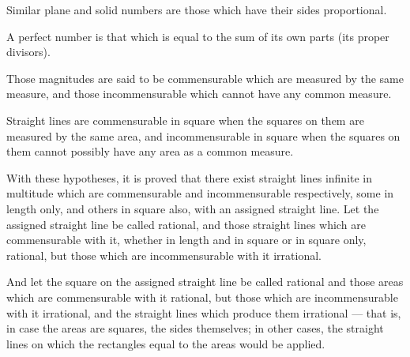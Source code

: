 \begin{scope}
\label{def:VII.21}
Similar plane and solid numbers are those which have their sides
proportional.
\end{scope}

\begin{scope}
\label{def:VII.22}
A perfect number is that which is equal to the sum of its own parts
(its proper divisors).
\end{scope}


\begin{scope}
\label{def:X.1}
Those magnitudes are said to be commensurable which are measured by
the same measure, and those incommensurable which cannot have any
common measure.
\end{scope}

\begin{scope}
\label{def:X.2}
Straight lines are commensurable in square when the squares on them
are measured by the same area, and incommensurable in square when the
squares on them cannot possibly have any area as a common measure.
\end{scope}

\begin{scope}
\label{def:X.3}
With these hypotheses, it is proved that there exist straight lines
infinite in multitude which are commensurable and incommensurable
respectively, some in length only, and others in square also, with
an assigned straight line.  Let the assigned straight line be called
rational, and those straight lines which are commensurable with it,
whether in length and in square or in square only, rational, but
those which are incommensurable with it irrational.
\end{scope}

\begin{scope}
\label{def:X.4}
And let the square on the assigned straight line be called rational
and those areas which are commensurable with it rational, but those
which are incommensurable with it irrational, and the straight lines
which produce them irrational --- that is, in case the areas are
squares, the sides themselves; in other cases, the straight lines on
which the rectangles equal to the areas would be applied.
\end{scope}

